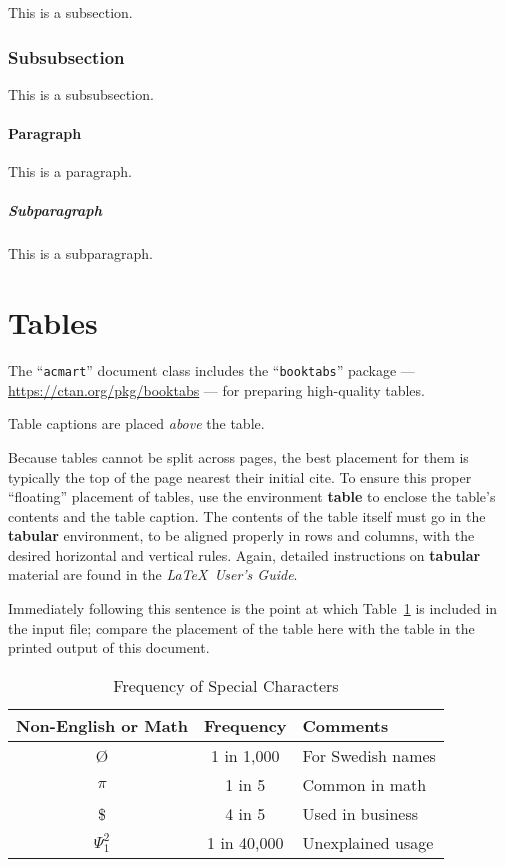 \documentclass[sigconf,authordraft]{acmart}
\begin{document}
This is a subsection.

\subsubsection{Subsubsection}
\label{sec:subsubsection}

This is a subsubsection.

\paragraph{Paragraph}

This is a paragraph.

\subparagraph{Subparagraph}

This is a subparagraph.

\section{Tables}

The ``\verb|acmart|'' document class includes the ``\verb|booktabs|''
package --- \url{https://ctan.org/pkg/booktabs} --- for preparing
high-quality tables.

Table captions are placed {\itshape above} the table.

Because tables cannot be split across pages, the best placement for
them is typically the top of the page nearest their initial cite.  To
ensure this proper ``floating'' placement of tables, use the
environment \textbf{table} to enclose the table's contents and the
table caption.  The contents of the table itself must go in the
\textbf{tabular} environment, to be aligned properly in rows and
columns, with the desired horizontal and vertical rules.  Again,
detailed instructions on \textbf{tabular} material are found in the
\textit{\LaTeX\ User's Guide}.

Immediately following this sentence is the point at which
Table~\ref{tab:freq} is included in the input file; compare the
placement of the table here with the table in the printed output of
this document.

\begin{table}
  \caption{Frequency of Special Characters}
  \label{tab:freq}
  \begin{tabular}{ccl}
    \toprule
    Non-English or Math&Frequency&Comments\\
    \midrule
    \O & 1 in 1,000& For Swedish names\\
    $\pi$ & 1 in 5& Common in math\\
    \$ & 4 in 5 & Used in business\\
    $\Psi^2_1$ & 1 in 40,000& Unexplained usage\\
  \bottomrule
\end{tabular}
\end{table}
\end{document}
